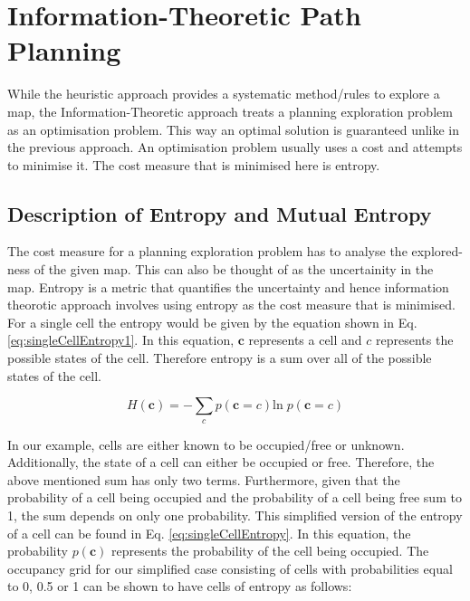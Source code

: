 \documentclass[a4paper,12pt]{article}
\begin{document}
	
	\section{Information-Theoretic Path Planning}
		While the heuristic approach provides a systematic method/rules to explore a map, the Information-Theoretic approach treats a planning exploration problem as an optimisation problem. This way an optimal solution is guaranteed unlike in the previous approach. An optimisation problem usually uses a cost and attempts to minimise it. The cost measure that is minimised here is entropy. 
		\subsection{Description of Entropy and Mutual Entropy}
			The cost measure for a planning exploration problem has to analyse the explored-ness of the given map. This can also be thought of as the uncertainity in the map. Entropy is a metric that quantifies the uncertainty and hence information theorotic approach involves using entropy as the cost measure that is minimised. For a single cell the entropy would be given by the equation shown in Eq. \ref{eq:singleCellEntropy1}. In this equation, $\textbf{c}$ represents a cell and $c$ represents the possible states of the cell. Therefore entropy is a sum over all of the possible states of the cell.

			\begin{equation}
				H \left(\textbf{c}\right) = - \sum_{c} p\left(\textbf{c}=c\right)\text{ln} \; p\left(\textbf{c}=c\right)
				\label{eq:singleCellEntropy1}
			\end{equation}
			
			In our example, cells are either known to be occupied/free or unknown. Additionally, the state of a cell can either be occupied or free. Therefore, the above mentioned sum has only two terms. Furthermore, given that the probability of a cell being occupied and the probability of a cell being free sum to 1, the sum depends on only one probability. This simplified version of the entropy of a cell can be found in Eq. \ref{eq:singleCellEntropy}. In this equation, the probability $p\left(\textbf{c}\right)$ represents the probability of the cell being occupied. The occupancy grid for our simplified case consisting of cells with probabilities equal to 0, 0.5 or 1 can be shown to have cells of entropy as follows:
\end{document}
